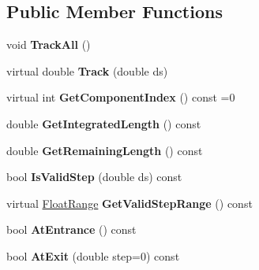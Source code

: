\subsection*{Public Member Functions}
\begin{DoxyCompactItemize}
\item 
\mbox{\label{classComponentIntegrator_a81037449593735e62c70fa6cd0c20768}} 
void {\bfseries Track\+All} ()
\item 
\mbox{\label{classComponentIntegrator_a5ea98e93a176d8581ac48f268173ebd5}} 
virtual double {\bfseries Track} (double ds)
\item 
\mbox{\label{classComponentIntegrator_a9cb39d2e0d4f22344817accd711c193c}} 
virtual int {\bfseries Get\+Component\+Index} () const =0
\item 
\mbox{\label{classComponentIntegrator_ab4350e450e7f45283a9d5919859c26cc}} 
double {\bfseries Get\+Integrated\+Length} () const
\item 
\mbox{\label{classComponentIntegrator_a421b563148487d2a54200d278764fc40}} 
double {\bfseries Get\+Remaining\+Length} () const
\item 
\mbox{\label{classComponentIntegrator_afab3c609d39a252ec6c63065a509f565}} 
bool {\bfseries Is\+Valid\+Step} (double ds) const
\item 
\mbox{\label{classComponentIntegrator_a9953712a9b723fec4de0ce73c6c469eb}} 
virtual \hyperlink{classNumericalRange}{Float\+Range} {\bfseries Get\+Valid\+Step\+Range} () const
\item 
\mbox{\label{classComponentIntegrator_aa44c60a7824f638dd29b22740279d2ae}} 
bool {\bfseries At\+Entrance} () const
\item 
\mbox{\label{classComponentIntegrator_a7b7ede6cc52f7bd3c763a5cb5b429900}} 
bool {\bfseries At\+Exit} (double step=0) const
\end{DoxyCompactItemize}
